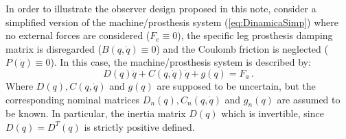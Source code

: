 \documentclass[letterpaper, 10 pt, conference]{ieeeconf}  %
\theoremstyle{plain}
\theoremstyle{definition}
\theoremstyle{remark}
\begin{document}
In order to illustrate the observer design proposed in this note, consider a simplified version of the machine/prosthesis system (\ref{eq:DinamicaSimp}) where no external forces are considered ($F_e \equiv 0$), the specific leg prosthesis damping matrix is disregarded ($B(q,\dot{q}) \equiv 0$) and the  Coulomb friction is neglected  ($P(\dot{q}) \equiv 0$). In this case, the machine/prosthesis system is described by:
%
\begin{equation}
D(q)\ddot{q} + C(q,\dot{q})\dot{q}+g(q) = F_a\,.
\label{eq:DinamicaSimp}
\end{equation}
%
Where $D(q), C(q,\dot{q})$ and $g(q)$ are supposed to be uncertain, but the corresponding nominal matrices  $D_n(q), C_n(q,\dot{q})$ and $g_n(q)$ are assumed to be known. In particular, the inertia matrix $D(q)$ which is invertible, since $D(q)=D^T(q)$ is strictly positive defined.
\end{document}

